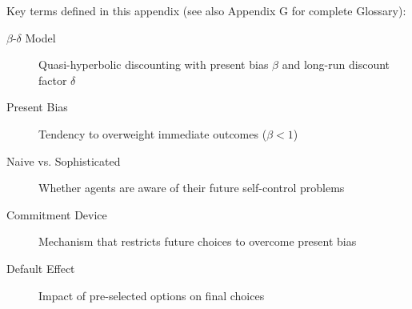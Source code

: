 \begin{tcolorbox}[colback=gray!10!white,colframe=gray!50!black,title=Quick Reference]
Key terms defined in this appendix (see also Appendix G for complete Glossary):
\begin{description}
    \item[$\beta$-$\delta$ Model] Quasi-hyperbolic discounting with present bias $\beta$ and long-run discount factor $\delta$
    \item[Present Bias] Tendency to overweight immediate outcomes ($\beta < 1$)
    \item[Naive vs. Sophisticated] Whether agents are aware of their future self-control problems
    \item[Commitment Device] Mechanism that restricts future choices to overcome present bias
    \item[Default Effect] Impact of pre-selected options on final choices
\end{description}
\end{tcolorbox}



